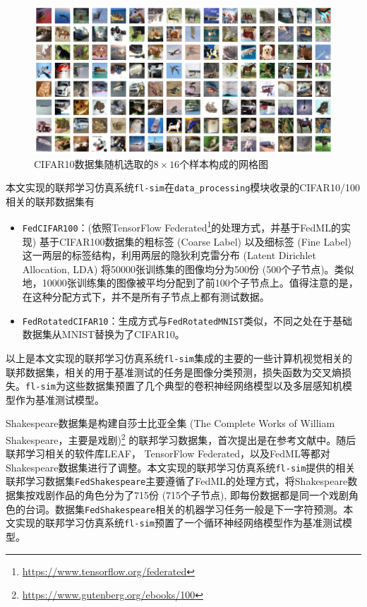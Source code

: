 \begin{figure}[ht]
\centering
\includegraphics[width=\textwidth]{figures/cifar10_random_grid_view.pdf}
\caption{CIFAR10数据集随机选取的$8\times 16$个样本构成的网格图}
\label{fig:cifar10_random_grid_view}
\end{figure}

本文实现的联邦学习仿真系统\texttt{fl-sim}在\texttt{data\_processing}模块收录的CIFAR10/100相关的联邦数据集有
\begin{itemize}
    \item \texttt{FedCIFAR100}：(依照TensorFlow Federated\footnote{\url{https://www.tensorflow.org/federated}}的处理方式，并基于FedML\cite{he_2020_fedml}的实现) 基于CIFAR100数据集的粗标签 (Coarse Label) 以及细标签 (Fine Label) 这一两层的标签结构，利用两层的隐狄利克雷分布 (Latent Dirichlet Allocation, LDA) \cite{Li_2006_LDA}将50000张训练集的图像均分为500份 (500个子节点)。类似地，10000张训练集的图像被平均分配到了前100个子节点上。值得注意的是，在这种分配方式下，并不是所有子节点上都有测试数据。
    \item \texttt{FedRotatedCIFAR10}：生成方式与\texttt{FedRotatedMNIST}\cite{Ghosh_2022_cfl}类似，不同之处在于基础数据集从MNIST替换为了CIFAR10。
\end{itemize}

以上是本文实现的联邦学习仿真系统\texttt{fl-sim}集成的主要的一些计算机视觉相关的联邦数据集，相关的用于基准测试的任务是图像分类预测，损失函数为交叉熵损失。\texttt{fl-sim}为这些数据集预置了几个典型\cite{mcmahan2017fed_avg, zhang2020fedpd, sahu2018fedprox}的卷积神经网络模型以及多层感知机模型作为基准测试模型。

Shakespeare数据集是构建自莎士比亚全集 (The Complete Works of William Shakespeare，主要是戏剧)\footnote{\url{https://www.gutenberg.org/ebooks/100}} 的联邦学习数据集，首次提出是在参考文献\parencite{mcmahan2017fed_avg}中。随后联邦学习相关的软件库LEAF\cite{caldas2018_leaf}， TensorFlow Federated，以及FedML\cite{he_2020_fedml}等都对Shakespeare数据集进行了调整。本文实现的联邦学习仿真系统\texttt{fl-sim}提供的相关联邦学习数据集\texttt{FedShakespeare}主要遵循了FedML\cite{he_2020_fedml}的处理方式，将Shakespeare数据集按戏剧作品的角色分为了715份 (715个子节点), 即每份数据都是同一个戏剧角色的台词。数据集\texttt{FedShakespeare}相关的机器学习任务一般是下一字符预测。本文实现的联邦学习仿真系统\texttt{fl-sim}预置了一个循环神经网络模型\cite{mcmahan2017fed_avg}作为基准测试模型。


